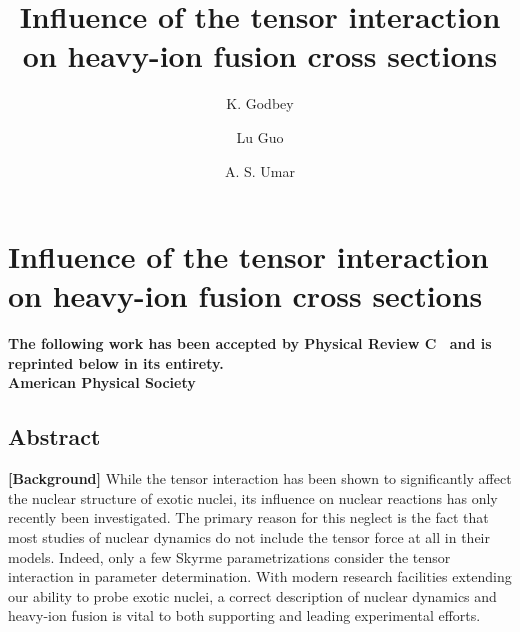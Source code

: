 
\chapter{Influence of the tensor interaction on heavy-ion fusion cross sections}\label{chapters:chapter_5}

\title{Influence of the tensor interaction on heavy-ion fusion cross sections}

\author[1]{K. Godbey}
\author[2,3]{Lu Guo}
\author[1]{A. S. Umar}


{

	\makeatletter

	\begin{center}
		\AB@authlist
		\AB@affillist
	\end{center}

	\makeatother
		\bfseries\centering
	The following work has been accepted by Physical Review C~\citep{godbey2019c} and is reprinted below in its entirety.\\
	 American Physical Society\\
}
\makeatletter
\renewcommand{\AB@affillist}{}
\renewcommand{\AB@authlist}{}
\setcounter{authors}{0}
\makeatother

\section*{Abstract}

		{\bf [Background]}		
		While the tensor interaction has been shown to significantly affect the nuclear structure of exotic nuclei, its influence on nuclear reactions has only recently been investigated.
		The primary reason for this neglect is the fact that most studies of nuclear dynamics do not include the tensor force at all in their models.
		Indeed, only a few Skyrme parametrizations consider the tensor interaction in parameter determination.
		With modern research facilities extending our ability to probe exotic nuclei, a correct description of nuclear dynamics and heavy-ion fusion is vital to both supporting and leading experimental efforts.
		

